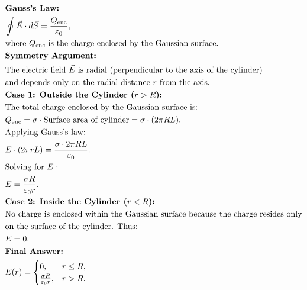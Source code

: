 \documentclass[12pt]{article}
\begin{document}
\begin{correctionbox}
	\begin{align*}
		 & \textbf{Gauss's Law:}                                                                            \\
		 & \oint \vec{E} \cdot d\vec{S} = \frac{Q_{\text{enc}}}{\varepsilon_0},                             \\
		 & \text{where } Q_{\text{enc}} \text{ is the charge enclosed by the Gaussian surface.}
		\\
		 & \textbf{Symmetry Argument:}                                                                      \\
		 & \text{The electric field } \vec{E} \text{ is radial (perpendicular to the axis of the cylinder)} \\
		 & \text{and depends only on the radial distance } r \text{ from the axis.}
		\\
		 & \textbf{Case 1: Outside the Cylinder ($ r > R $):}                                               \\
		 & \text{The total charge enclosed by the Gaussian surface is:}                                     \\
		 & Q_{\text{enc}} = \sigma \cdot \text{Surface area of cylinder} = \sigma \cdot (2 \pi R L).        \\
		 & \text{Applying Gauss's law:}                                                                     \\
		 & E \cdot (2 \pi r L) = \frac{\sigma \cdot 2 \pi R L}{\varepsilon_0}.                              \\
		 & \text{Solving for } E:                                                                           \\
		 & E = \frac{\sigma R}{\varepsilon_0 r}.
		\\
		 & \textbf{Case 2: Inside the Cylinder ($ r < R $):}                                                \\
		 & \text{No charge is enclosed within the Gaussian surface because the charge resides only}         \\
		 & \text{on the surface of the cylinder. Thus:}                                                     \\
		 & E = 0.
		\\
		 & \textbf{Final Answer:}                                                                           \\
		 & E(r) =
		\begin{cases}
			0,                                & r \leq R, \\
			\frac{\sigma R}{\varepsilon_0 r}, & r > R.
		\end{cases}
	\end{align*}
\end{correctionbox}
\end{document}
